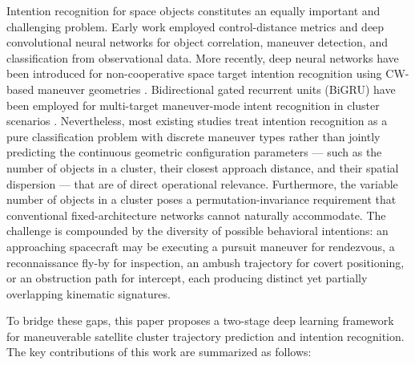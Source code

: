 \documentclass[a4paper,fleqn]{cas-dc}
\begin{document}
Intention recognition for space objects constitutes an equally important and challenging problem. Early work employed control-distance metrics \cite{holzinger2012maneuver} and deep convolutional neural networks \cite{linares2020space} for object correlation, maneuver detection, and classification from observational data. More recently, deep neural networks have been introduced for non-cooperative space target intention recognition using CW-based maneuver geometries \cite{sun2023deep}. Bidirectional gated recurrent units (BiGRU) have been employed for multi-target maneuver-mode intent recognition in cluster scenarios \cite{tong2024cluster}. Nevertheless, most existing studies treat intention recognition as a pure classification problem with discrete maneuver types rather than jointly predicting the continuous geometric configuration parameters --- such as the number of objects in a cluster, their closest approach distance, and their spatial dispersion --- that are of direct operational relevance. Furthermore, the variable number of objects in a cluster poses a permutation-invariance requirement that conventional fixed-architecture networks cannot naturally accommodate. The challenge is compounded by the diversity of possible behavioral intentions: an approaching spacecraft may be executing a pursuit maneuver for rendezvous, a reconnaissance fly-by for inspection, an ambush trajectory for covert positioning, or an obstruction path for intercept, each producing distinct yet partially overlapping kinematic signatures.

To bridge these gaps, this paper proposes a two-stage deep learning framework for maneuverable satellite cluster trajectory prediction and intention recognition. The key contributions of this work are summarized as follows:
\end{document}
